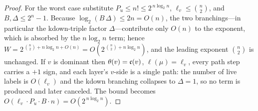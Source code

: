 \documentclass{amsart}
\theoremstyle{definition}
\theoremstyle{remark}
\numberwithin{equation}{section}
\begin{document}
\begin{proof}
For the worst case substitute $P_u\leq n!\leq 2^{\,n\log_2 n}$, $\ell_v\leq\binom{n}{2}$, and $B,\Delta\leq 2^{n}-1$. Because $\log_2(B\,\Delta)\leq 2n=O(n)$, the two branchings---in particular the kdown-triple factor $\Delta$---contribute only $O(n)$ to the exponent, which is absorbed by the $n\log_2 n$ term; hence $W=2^{\,\binom{n}{2}+n\log_2 n+O(n)}=O\!\left(2^{\,\binom{n}{2}+n\log_2 n}\right)$, and the leading exponent $\binom{n}{2}$ is unchanged. If $v$ is dominant then $\theta(v)=\mathfrak{c}(v)$, $\ell(\mu)=\ell_v$, every path step carries a $+1$ sign, and each layer's $v$-side is a single path: the number of live labels is $O(\ell_v)$ and the kdown branching collapses to $\Delta=1$, so no term is produced and later canceled. The bound becomes $O(\ell_v\cdot P_u\cdot B\cdot n)=O(2^{\,n\log_2 n})$.
\end{proof}
\end{document}
